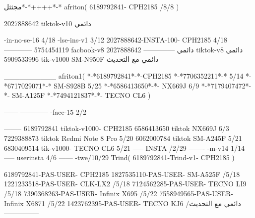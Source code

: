 مجثثل*-*++++*-*
afriton(
6189792841- CPH2185  /8/8
)

2027888642 tiktok-v10
دائمي

-in-no-se-16 4/18
-lse-ins-v1 3/12
2027888642-INSTA-100- CPH2185 4/18
------------
5754454119 facbook-v8
دائمي
--------------
2027888642 tiktok-v8
دائمي
5909533996 tik-v1000  SM-N950F
دائمي مع التحديث

__________
afriton1(
*-*6189792841*-*-CPH2185
*-*7706352211*-* 5/14
*-*6717029071*-*  SM-S928B 5/25
*-*6586413650*-*- NX669J  6/9
*-*7179407472*-*-  SM-A125F \5
*-*7494121837*-*-  TECNO CL6  \5
)


------
------------
-face-15 2/2

--------
6189792841 tiktok-v1000- CPH2185 
6586413650 tiktok NX669J  6/3
7229388873 tiktok Redmi Note 8 Pro   5/20
6062000784 tiktok SM-A245F   5/21
6830409514 tik-v1000- TECNO CL6  5/21
-----
 INSTA /2/29
-------
-m-v14 1/14
-----
userinsta 4/6
------
-twe/10/29
Trind(
6189792841-Trind-v1- CPH2185 
)

6189792841-PAS-USER- CPH2185 
1827535110-PAS-USER- SM-A525F  /5/18
1221233518-PAS-USER-  CLK-LX2  /5/18
7124562285-PAS-USER-  TECNO LI9  /5/18
7390368263-PAS-USER-  Infinix X695  /5/22
7558949565-PAS-USER-  Infinix X6871  /5/22
1423762395-PAS-USER- TECNO KJ6  /دائمي مع التحديث
    ---------------
